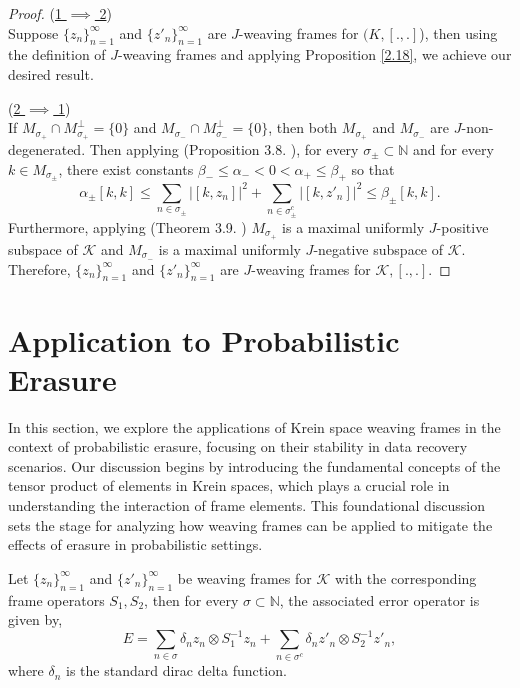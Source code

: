 \documentclass[article,12pt]{amsart}
\begin{document}
\begin{proof}
	 \noindent  (\underline{1 $\implies$ 2})\\
	 Suppose $\{z_n\}^\infty_{n= 1}$ and $\{z'_n\}^\infty_{n= 1}$ are $J$-weaving frames for $\mathcal({K}, [., .]$), then using the definition of $J$-weaving frames and applying Proposition \ref{2.18}, we achieve our desired result.
	
	\noindent  (\underline{2 $\implies$ 1})\\
	If  $M_{\sigma_+} \cap M^\perp_{\sigma_+} = \{0\}$ and $M_{\sigma_-} \cap M^\perp_{\sigma_-} = \{0\}$, then both $M_{\sigma_+}$ and $M_{\sigma_-}$ are $J$-non-degenerated. Then applying (Proposition 3.8. \cite{Gi12}),  for every $ \sigma_{\pm} \subset \mathbb{N}$ and for every $k \in M_{\sigma_{\pm}}$, there exist constants $ \beta_{-} \leq  \alpha_- < 0 < \alpha_+ \leq \beta_{+}$ so that 
	$$	\alpha_{\pm} [k, k]  \leq \sum\limits_{n \in \sigma_{\pm}} |[k, z_n]|^2 + \sum\limits_{n \in \sigma_{\pm}^c} |[k, z'_n]|^2 \leq \beta_{\pm} [k, k].$$
	Furthermore, applying (Theorem 3.9. \cite{Gi12}) $M_{\sigma_+}$ is a maximal uniformly $J$-positive subspace of $\mathcal{K}$ and  $M_{\sigma_-}$ is a maximal uniformly $J$-negative subspace of $\mathcal{K}.$ Therefore, $\{z_n\}^\infty_{n= 1}$ and $\{z'_n\}^\infty_{n= 1}$ are $J$-weaving frames for $\mathcal{K}, [., .]$.
\end{proof}



 \section{Application to Probabilistic Erasure}
 
 In this section, we explore the applications of Krein space weaving frames in the context of probabilistic erasure, focusing on their stability in data recovery scenarios. Our discussion begins by introducing the fundamental concepts of the tensor product of elements in Krein spaces, which plays a crucial role in understanding the interaction of frame elements. This foundational discussion sets the stage for analyzing how weaving frames can be applied to mitigate the effects of erasure in probabilistic settings.
 
Let $\{z_n\}_{n=1}^\infty$ and $\{z'_n\}_{n=1}^\infty$ be weaving frames for $\mathcal K$ with the corresponding frame operators $S_1, S_2$, then for every $\sigma \subset \mathbb N$, the associated error operator is given by,
\begin{equation*}
E=\sum\limits_{n \in \sigma} \delta_n z_n \otimes S_1^{-1} z_n + \sum\limits_{n \in \sigma^c} \delta_n z'_n \otimes S_2^{-1} z'_n,
\end{equation*}
where $\delta_n$ is the standard dirac delta function. 
 
\end{document}
